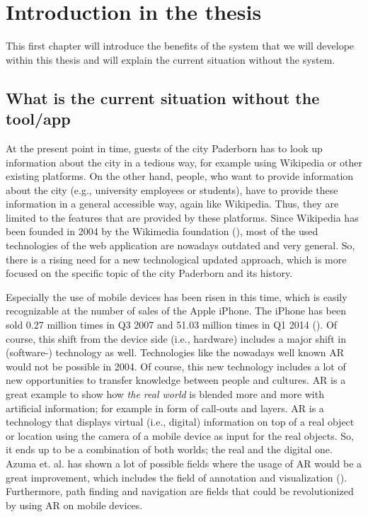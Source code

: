 \chapter[Introduction into the thesis]{Introduction in the thesis}
This first chapter will introduce the benefits of the system that we will develope within this thesis and will explain the current situation without the system.

\section{What is the current situation without the tool/app}
At the present point in time, guests of the city Paderborn has to look up information about the city in a tedious way, for example using Wikipedia or other existing platforms. On the other hand, people, who want to provide information about the city (e.g., university employees or students), have to provide these information in a general accessible way, again like Wikipedia. Thus, they are limited to the features that are provided by these platforms. Since Wikipedia has been founded in 2004 by the Wikimedia foundation (\cite{wikimedia}), most of the used technologies of the web application are nowadays outdated and very general. So, there is a rising need for a new technological updated approach, which is more focused on the specific topic of the city Paderborn and its history. 

Especially the use of mobile devices has been risen in this time, which is easily recognizable at the number of sales of the Apple iPhone. The iPhone has been sold 0.27 million times in Q3 2007 and 51.03 million times in Q1 2014 (\cite{statIPhone}). Of course, this shift from the device side (i.e., hardware) includes a major shift in (software-) technology as well. Technologies like the nowadays well known \ac{AR} would not be possible in 2004. Of course, this new technology includes a lot of new opportunities to transfer knowledge between people and cultures. \ac{AR} is a great example to show how \emph{the real world} is blended more and more with artificial information; for example in form of call-outs and layers. \ac{AR} is a technology that displays virtual (i.e., digital) information on top of a real object or location using the camera of a mobile device as input for the real objects. So, it ends up to be a combination of both worlds; the real and the digital one. Azuma et. al. has shown a lot of possible fields where the usage of \ac{AR} would be a great improvement, which includes the field of annotation and visualization (\cite{Azu97}). Furthermore, path finding and navigation are fields that could be revolutionized by using \ac{AR} on mobile devices.

